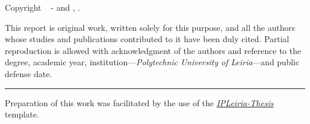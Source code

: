 {{    \noindent Copyright \textcopyright~\the\year{} - \GetFirstAuthor\ifdefined\GetSecondAuthor{} and \GetSecondAuthor\fi, \GetSchool.
    
    \vspace{.575em}
    
    \noindent This report is original work, written solely for this purpose, and all the authors whose studies and publications contributed to it have been duly cited. Partial reproduction is allowed with acknowledgment of the authors and reference to the degree, academic year, institution---\textit{Polytechnic University of Leiria}---and public defense date.

    \vspace{1.395em}
    
    \noindent\rule{4cm}{0.4pt}
    
    \vspace{.935em}

    \noindent Preparation of this work was facilitated by the use of the \href{https://github.com/joseareia/ipleiria-thesis}{\textit{IPLeiria-Thesis}} template.
}}

\vspace*{\fill}
\MediaOptionLogic